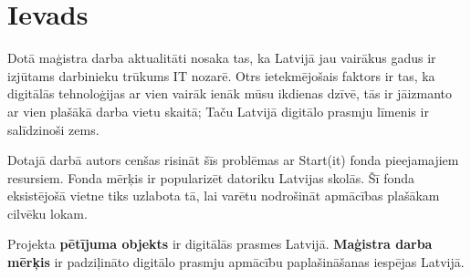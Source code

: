 \chapter*{Ievads} %
Dotā maģistra darba aktualitāti nosaka tas, ka Latvijā jau vairākus gadus ir izjūtams darbinieku 
trūkums IT nozarē. Otrs ietekmējošais faktors ir tas, ka digitālās tehnoloģijas ar vien vairāk
ienāk mūsu ikdienas dzīvē, tās ir jāizmanto ar vien plašākā darba vietu skaitā; Taču Latvijā
digitālo prasmju līmenis ir salīdzinoši zems. 
\par
Dotajā darbā autors cenšas risināt šīs problēmas ar Start(it) fonda pieejamajiem resursiem. Fonda mērķis
ir popularizēt datoriku Latvijas skolās. Šī fonda eksistējošā vietne tiks uzlabota tā, lai varētu 
nodrošināt apmācības plašākam cilvēku lokam.
\par
Projekta \textbf{pētījuma objekts} ir digitālās prasmes Latvijā.
\textbf{Maģistra darba mērķis} ir padziļināto digitālo prasmju apmācību paplašināšanas iespējas Latvijā.

